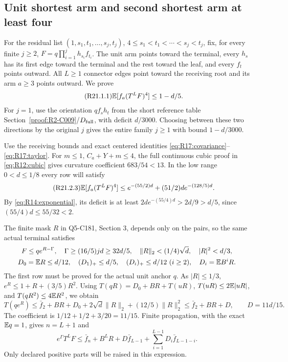 \subsection{Unit shortest arm and second shortest arm at least four}\label{proof:R2-C021}
For the residual list $(1,s_1,t_1,\ldots,s_j,t_j)$,
$4\le s_1<t_1<\cdots<s_j<t_j$, fix, for every finite $j\ge2$,
$F=q\prod_{i=1}^jh_{s_i}f_{t_i}$. The unit arm points toward the
terminal, every $h_s$ has its first edge toward the terminal and the
rest toward the leaf, and every $f_t$ points outward. All $L\ge1$
connector edges point toward the receiving root and its arm $a\ge3$
points outward. We prove
\begin{equation}\tag{R21.1.1}\label{eq:R21:claim}
\mathbb E[f_a(T^LF)^4]\le1-d/5.
\end{equation}
For $j=1$, use the orientation $qf_sh_t$ from the
short reference table Section~\ref{proof:R2-C009}/$D_{\rm full}$, with deficit
$d/3000$. Choosing between these two directions by the original $j$
gives the entire family $j\ge1$ with bound $1-d/3000$.

Use the receiving bounds and exact centered identities
\eqref{eq:R17:covariance}--\eqref{eq:R17:taylor}.
For $m\le1$, $C_a+Y+m\le4$, the full continuous cubic proof in
\eqref{eq:R12:cubic} gives curvature coefficient $683/54<13$.
In the low range $0<d\le1/8$ every row will satisfy
\begin{equation}\tag{R21.2.3}\label{eq:R21:payment}
\mathbb E[f_a(T^LF)^4]\le e^{-(55/2)d}+(51/2)de^{-(128/5)d}.
\end{equation}
By \eqref{eq:R14:exponential}, its deficit is at least
$2de^{-(55/4)d}>2d/9>d/5$, since $(55/4)d\le55/32<2$.

The finite mask $R$ in Q5-C181, Section 3, depends only on the pairs,
so the same actual terminal satisfies
\[
\begin{gathered}
F\le qe^{R-\Gamma},\quad\Gamma\ge(16/5)jd\ge32d/5,
\quad\|R\|_2<(1/4)\sqrt d,\quad|R|^2<d/3,\\
D_0=\mathbb E R\le d/12,\quad(D_1)_+\le d/5,\quad
(D_i)_+\le d/12\ (i\ge2),\quad D_i=\mathbb E B^iR.
\end{gathered}
\]
The first row must be proved for the actual unit anchor $q$.
As $|R|\le1/3$, $e^R\le1+R+(3/5)R^2$.
Using $T(qR)=D_0+BR+T(uR)$,
$T(uR)\le2\mathbb E|uR|$, and $T(qR^2)\le4\mathbb E R^2$, we obtain
\begin{equation}\tag{R21.3.1}\label{eq:R21:firstrow}
T(qe^R)\le\bar f_2+BR+D_0+2\sqrt d\|R\|_2+(12/5)\|R\|_2^2
\le\bar f_2+BR+D,\qquad D=11d/15.
\end{equation}
The coefficient is $1/12+1/2+3/20=11/15$.
Finite propagation, with the exact $\mathbb E q=1$, gives $n=L+1$ and
\begin{equation}\tag{R21.3.2}\label{eq:R21:propagation}
e^\Gamma T^LF\le\bar f_n+B^LR+D\bar f_{L-1}
+\sum_{i=1}^{L-1}D_i\bar f_{L-1-i}.
\end{equation}
Only declared positive parts will be raised in this expression.

